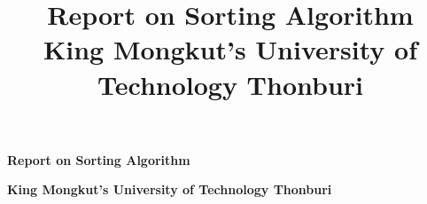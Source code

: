 \documentclass{article}
\title{Report on Sorting Algorithm\\ \vspace{10pt} \large King Mongkut's University of Technology Thonburi}
\date{} %
\begin{document}
\begin{titlepage}
    \centering
    \vspace*{4cm}
    {\Huge \textbf{Report on Sorting Algorithm} \par}
    \vspace{1.5cm}
    {\Large \textbf{King Mongkut's University of Technology Thonburi} \par}
    \vfill
\end{titlepage}

\maketitle
\end{document}
